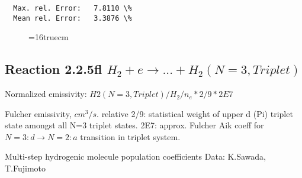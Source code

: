 \documentclass[12pt,dvipdfmx]{article}
\begin{document}
\begin{small}
\begin{verbatim}
  Max. rel. Error:   7.8110 \%
  Mean rel. Error:   3.3876 \%

\end{verbatim}\end{small}
\begin{figure} \label{2.2.5e}
\epsfxsize=16truecm
\end{figure}

\newpage
\subsection{
Reaction 2.2.5fl $H_2 + e \rightarrow ...+ H_2(N=3,Triplet)$}

Normalized emissivity: $H2(N=3, Triplet)/H_2/n_e*2/9*2E7 $

 Fulcher emissivity, $cm^3/s$. relative 2/9: statistical weight of upper d (Pi) triplet state
amongst all N=3 triplet states.
2E7: approx. Fulcher Aik coeff for $N=3: d \rightarrow N=2: a$ transition in triplet system.

 Multi-step hydrogenic molecule population coefficients
 Data: K.Sawada, T.Fujimoto \cite{kn:Sawada}
\end{document}
